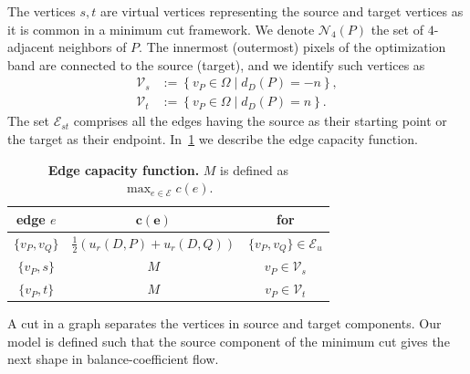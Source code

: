 \documentclass{siamart220329}
\newcommand{\digset}{D} %
\begin{document}
The vertices $s,t$ are virtual vertices representing the source and target
vertices as it is common in a minimum cut framework. We denote
$\mathcal{N}_4(P)$ the set of $4$-adjacent neighbors of $P$. The innermost
(outermost) pixels of the optimization band are connected to the source
(target), and we identify such vertices as
%
%
\begin{align*}
	\mathcal{V}_s &:=\left\{ v_P \in \Omega \; | \; d_{\digset}(P) = -n \right\}, \\
	\mathcal{V}_t &:=\left\{ v_P \in \Omega \; | \; d_{\digset}(P) = n \right\}.
\end{align*}
%
%
The set $\mathcal{E}_{st}$ comprises all the edges having the source as their
starting point or the target as their endpoint. In~\cref{tab:edge-capacity} we
describe the edge capacity function.
%
%
\begin{table}
\footnotesize
	\caption{\textbf{Edge capacity function.} $M$ is defined as $\max_{e \in \mathcal{E} }{ c(e) }$.}\label{tab:edge-capacity}
\begin{center}
\begin{tabular}{|c|c|c|}
\hline
\textbf{edge} $e$ & $\mathbf{c(e)}$ & \textbf{for}\\
\hline
$\{v_P, v_Q\}$ & $ \frac{1}{2}\left( u_r(\digset,P) + u_r(\digset,Q) \right) $ & $\{v_P,v_Q\} \in \mathcal{E}_{u}$\\
\hline
$\{v_P, s\}$ & $M$ & $v_P \in \mathcal{V}_{s}$ \\
\hline
$\{v_P, t\}$ & $M$ & $v_P \in \mathcal{V}_{t}$ \\
\hline
\end{tabular}
\end{center}
\end{table}
%
%

A cut in a graph separates the vertices in source and target components. Our
model is defined such that the source component of the minimum cut gives the
next shape in balance-coefficient flow. 

%
%
%
%
\end{document}
